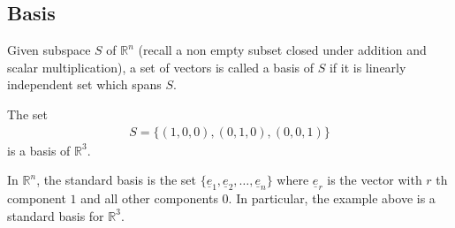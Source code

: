 \documentclass[a4paper]{article}
\theoremstyle{plain}
\theoremstyle{definition}
\newtheorem{defn}{Definition}[section]
\newtheorem{exmp}{Example}[section]
\theoremstyle{remark}
\begin{document}
\subsection{Basis}
\begin{tcolorbox}[colback=black!3!white,colframe=black!60!white,title=\begin{defn}Basis \label{Basis}\end{defn}]
Given subspace $S$ of $\mathbb{R}^{n}$ (recall a non empty subset closed under addition and scalar multiplication), a set of vectors is called a basis of $S$ if it is linearly independent set which spans $S$.
\end{tcolorbox}
\begin{tcolorbox}[colback=black!3!white,colframe=black!60!white,title=\begin{exmp}Basis of R3 \label{Basis of R3}\end{exmp}]
        The set
                \begin{align}
               S = \{(1,0,0),(0,1,0),(0,0,1) \} 
                \end{align}
		is a basis of $\mathbb{R}^{3}$. 
\end{tcolorbox}
\begin{tcolorbox}[colback=black!3!white,colframe=black!60!white,title=\begin{defn}Standard Basis \label{Standard Basis}\end{defn}]
In $\mathbb{R}^{n}$, the standard basis is the set $\{ \underline{e}_1, \underline{e}_2, \ldots, \underline{e}_n \}$ where $\underline{e}_r$ is the vector with $r$ th component $1$ and all other components $0$. In particular, the example above is a standard basis for $\mathbb{R}^{3}$.
\end{tcolorbox}
\end{document}
